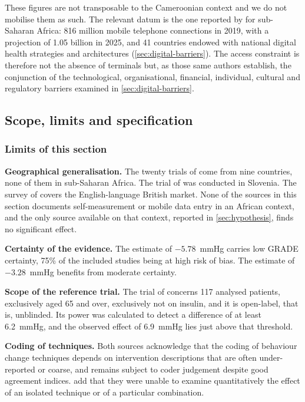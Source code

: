 \documentclass[12pt,a4paper,oneside]{report}
\begin{document}
These figures are not transposable to the Cameroonian context and we do not mobilise them as such. The relevant datum is the one reported by \textcite{dodoo2022} for sub-Saharan Africa: 816 million mobile telephone connections in 2019, with a projection of 1.05 billion in 2025, and 41 countries endowed with national digital health strategies and architectures (\cref{sec:digital-barriers}). The access constraint is therefore not the absence of terminals but, as those same authors establish, the conjunction of the technological, organisational, financial, individual, cultural and regulatory barriers examined in \cref{sec:digital-barriers}.

\subsection{Scope, limits and specification}\label{sec:spec13}

\subsubsection{Limits of this section}

\textbf{Geographical generalisation.} The twenty trials of \textcite{zhou2024} come from nine countries, none of them in sub-Saharan Africa. The trial of \textcite{mihevc2025} was conducted in Slovenia. The survey of \textcite{alessa2019} covers the English-language British market. None of the sources in this section documents self-measurement or mobile data entry in an African context, and the only source available on that context, reported in \cref{sec:hypothesis}, finds no significant effect.

\textbf{Certainty of the evidence.} The estimate of $-5.78$~mmHg carries low GRADE certainty, 75\% of the included studies being at high risk of bias. The estimate of $-3.28$~mmHg benefits from moderate certainty.

\textbf{Scope of the reference trial.} The trial of \textcite{mihevc2025} concerns 117 analysed patients, exclusively aged 65 and over, exclusively not on insulin, and it is open-label, that is, unblinded. Its power was calculated to detect a difference of at least 6.2~mmHg, and the observed effect of 6.9~mmHg lies just above that threshold.

\textbf{Coding of techniques.} Both sources acknowledge that the coding of behaviour change techniques depends on intervention descriptions that are often under-reported or coarse, and remains subject to coder judgement despite good agreement indices. \Textcite{zhou2024} add that they were unable to examine quantitatively the effect of an isolated technique or of a particular combination.
\end{document}
